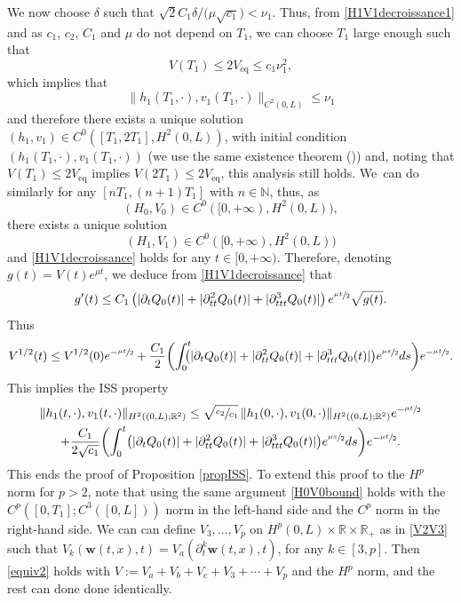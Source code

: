 We now choose $\delta$ such that \hbox{${\sqrt{2}C_{1}\delta/(\mu \sqrt{c_{1}}})\!<\!\nu_{1}$}. Thus,
from \eqref{H1V1decroissance1} and as $c_{1}$, $c_{2}$, $C_{1}$ and $\mu$ do not depend on $T_{1}$, we can choose $T_{1}$ large enough such that
\begin{equation*}
V(T_{1})\leq 2V_\mathrm{eq}\leq c_{1}\nu_{1}^{2},
\end{equation*}
which implies that
\begin{equation*}
\lVert h_{1}(T_{1},\cdot),v_{1}(T_{1},\cdot)\rVert_{C^{2}(0,L)}\leq \nu_{1}
\end{equation*}
and therefore there exists a unique solution $(h_{1},v_{1})\!\in\! C^{0}([T_{1},2T_{1}],H^{2}(0,L))$, with initial condition $(h_{1}(T_{1},\cdot),v_{1}(T_{1},\cdot))$ (we use the same existence theorem (\cite[Th.\,2.1]{Wang})) and,
noting that $V(T_{1})\leq 2V_\mathrm{eq}$ implies $V(2T_{1})\leq 2V_\mathrm{eq}$,
this analysis still holds.
We~can do similarly for any $[nT_{1},(n+1)T_{1}]$ with $n\in\mathbb{N}$, thus, as
\[
(H_{0},V_{0})\in C^{0}([0,+\infty),H^{2}(0,L)),
\]
there exists a unique solution
\[
(H_{1},V_{1})\in C^{0}([0,+\infty),H^{2}(0,L))
\]
and \eqref{H1V1decroissance} holds for any $t\in[0,+\infty)$.
Therefore, denoting $g(t)=V(t)e^{\mu t}$,
we deduce from \eqref{H1V1decroissance} that
\begin{equation}
\label{ISS0}
g'(t)\leq C_{1}\left(|\partial_{t}Q_{0}(t)|+|\partial_{tt}^{2}Q_{0}(t)|+|\partial_{ttt}^{3}Q_{0}(t)|\right)e^{\sfrac{\mu t}{2}}\sqrt{g(t)}.
\end{equation}
Thus
\begin{equation*}
V^{1/2}(t)\leq V^{1/2}(0)e^{-\sfrac{\mu t}{2}}+\frac{C_{1}}{2} \biggl(\int_{0}^{t}\hspace*{-2mm}\bigl(|\partial_{t}Q_{0}(t)|+|\partial_{tt}^{2}Q_{0}(t)|+|\partial_{ttt}^{3}Q_{0}(t)|\bigr)e^{\sfrac{\mu s}{2}}ds\biggr)e^{-\sfrac{\mu t}{2}}.
\end{equation*}
This implies the ISS property
\begin{multline}
\label{eqISS}
\lVert h_{1}(t,\cdot),v_{1}(t,\cdot)\rVert_{H^{2}((0,L);\mathbb{R}^{2})}\leq \sqrt{\sfrac{c_{2}}{c_{1}}}\,\lVert h_{1}(0,\cdot),v_{1}(0,\cdot)\rVert_{H^{2}((0,L);\mathbb{R}^{2})}e^{-\sfrac{\mu t}{2}}\\
+\frac{C_{1}}{2\sqrt{c_{1}}}\biggl(\int_{0}^{t}\bigl(|\partial_{t}Q_{0}(t)|+|\partial_{tt}^{2}Q_{0}(t)|+|\partial_{ttt}^{3}Q_{0}(t)|\bigl)e^{\sfrac{\mu s}{2}}ds \biggr)e^{-\sfrac{\mu t}{2}}.
\end{multline}
This ends the proof of Proposition \ref{propISS}.
To extend this proof to the $H^{p}$ norm for $p>2$, note that using the same argument
\eqref{H0V0bound} holds with the $C^{p}([0,T_{1}];C^{3}([0,L]))$ norm in the left-hand side and the $C^{p}$ norm in the right-hand side.
We can can define $V_{3},\dots,V_{p}$ on $H^{p}(0,L)\times\mathbb{R}\times\mathbb{R}_{+}$ as in \eqref{V2V3} such that $V_{k}(\boldsymbol{w}(t,x),t)=V_{a}(\partial_{t}^{k}\boldsymbol{w}(t,x),t)$, for any $k\in[3,p]$.
Then \eqref{equiv2} holds with $V:=V_{a}+V_{b}+V_{c}+V_{3}+\cdots+ V_{p}$ and the $H^{p}$ norm, and the rest can done done identically.


